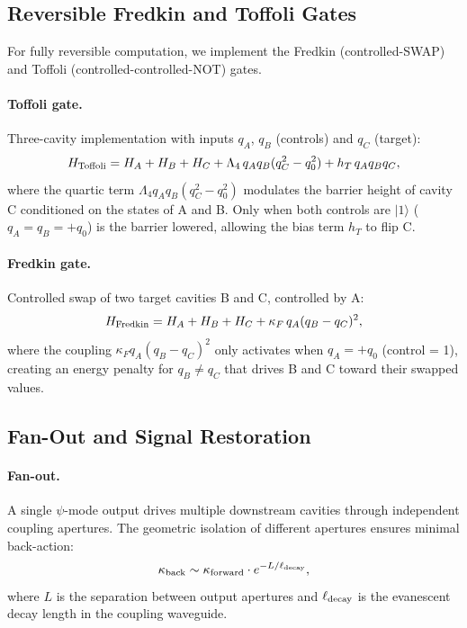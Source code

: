 \documentclass[12pt,a4paper,twoside]{article}
\begin{document}
\subsection{Reversible Fredkin and Toffoli Gates}\label{sec:reversible_gates}

For fully reversible computation, we implement the Fredkin (controlled-SWAP) and Toffoli (controlled-controlled-NOT) gates.

\paragraph{Toffoli gate.} Three-cavity implementation with inputs $q_A$, $q_B$ (controls) and $q_C$ (target):
\begin{equation}
H_{\rm Toffoli} = H_A + H_B + H_C + \Lambda_4\,q_A q_B(q_C^2 - q_0^2) + h_T\,q_A q_B q_C,
\end{equation}
where the quartic term $\Lambda_4 q_A q_B(q_C^2 - q_0^2)$ modulates the barrier height of cavity C conditioned on the states of A and B. Only when both controls are $|1\rangle$ ($q_A = q_B = +q_0$) is the barrier lowered, allowing the bias term $h_T$ to flip C.

\paragraph{Fredkin gate.} Controlled swap of two target cavities B and C, controlled by A:
\begin{equation}
H_{\rm Fredkin} = H_A + H_B + H_C + \kappa_F\,q_A(q_B - q_C)^2,
\end{equation}
where the coupling $\kappa_F q_A(q_B - q_C)^2$ only activates when $q_A = +q_0$ (control = 1), creating an energy penalty for $q_B \neq q_C$ that drives B and C toward their swapped values.

\subsection{Fan-Out and Signal Restoration}\label{sec:fanout}

\paragraph{Fan-out.} A single $\psi$-mode output drives multiple downstream cavities through independent coupling apertures. The geometric isolation of different apertures ensures minimal back-action:
\begin{equation}
\kappa_{\rm back} \sim \kappa_{\rm forward} \cdot e^{-L/\ell_{\rm decay}},
\end{equation}
where $L$ is the separation between output apertures and $\ell_{\rm decay}$ is the evanescent decay length in the coupling waveguide.
\end{document}
